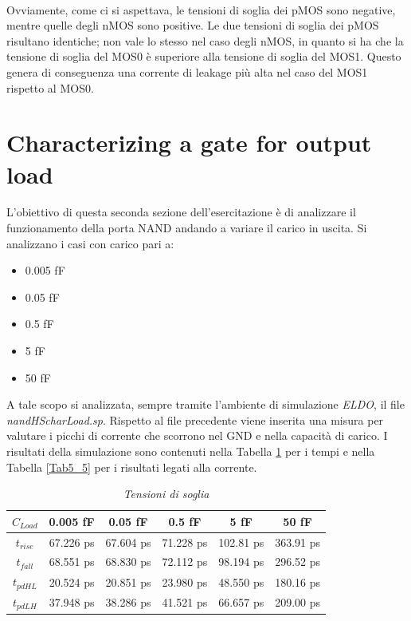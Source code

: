 \\
Ovviamente, come ci si aspettava, le tensioni di soglia dei pMOS sono negative, mentre quelle degli nMOS sono positive. Le due tensioni di soglia dei pMOS risultano identiche; non vale lo stesso nel caso degli nMOS, in quanto si ha che la tensione di soglia del MOS0 è superiore alla tensione di soglia del MOS1. Questo genera di conseguenza una corrente di leakage più alta nel caso del MOS1 rispetto al MOS0.

\section{Characterizing a gate for output load}
L'obiettivo di questa seconda sezione dell'esercitazione è di analizzare il funzionamento della porta NAND andando a variare il carico in uscita. Si analizzano i casi con carico pari a:
\begin{itemize}
	\item 0.005 fF
	\item 0.05 fF
	\item 0.5 fF
	\item 5 fF
	\item 50 fF	
\end{itemize}
A tale scopo si analizzata, sempre tramite l'ambiente di simulazione \textit{ELDO}, il file \textit{nandHScharLoad.sp}. Rispetto al file precedente viene inserita una misura per valutare i picchi di corrente che scorrono nel GND e nella capacità di carico. I risultati della simulazione sono contenuti nella Tabella \ref{Tab5_4} per i tempi e nella Tabella \ref{Tab5_5} per i risultati legati alla corrente.
\begin{table}[!h]\footnotesize
	\centering
	\begin{tabular}{|c|c|c|c|c|c|}
		\hline
		\textbf{$C_{Load}$} & \textbf{0.005 fF} & \textbf{0.05 fF} & \textbf{0.5 fF} & \textbf{5 fF} & \textbf{50 fF}\\
		\hline
		$t_{rise}$ &67.226 ps &67.604 ps &71.228 ps &102.81 ps &363.91 ps \\
		
		$t_{fall}$ &68.551 ps &68.830 ps &72.112 ps &98.194 ps &296.52 ps \\
		
		$t_{pdHL}$&20.524 ps &20.851 ps &23.980 ps &48.550 ps &180.16 ps \\
		
		$t_{pdLH}$ &37.948 ps&38.286 ps &41.521 ps &66.657 ps &209.00 ps \\
		
		\hline
	\end{tabular}
	\caption{\textit{Tensioni di soglia}}
	\label{Tab5_4}
\end{table}
